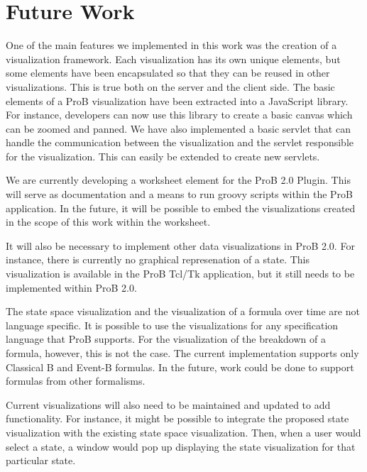 \section{Future Work}

One of the main features we implemented in this work was the creation of a visualization framework. Each visualization has its own unique elements, but some elements have been encapsulated so that they can be reused in other visualizations. This is true both on the server and the client side. The basic elements of a ProB visualization have been extracted into a JavaScript library. For instance, developers can now use this library to create a basic canvas which can be zoomed and panned. We have also implemented a basic servlet that can handle the communication between the visualization and the servlet responsible for the visualization. This can easily be extended to create new servlets.

We are currently developing a worksheet element for the ProB 2.0 Plugin. This will serve as documentation and a means to run groovy scripts within the ProB application. In the future, it will be possible to embed the visualizations created in the scope of this work within the worksheet. 

It will also be necessary to implement other data visualizations in ProB 2.0. For instance, there is currently no graphical represenation of a state. This visualization is available in the ProB Tcl/Tk application, but it still needs to be implemented within ProB 2.0.

The state space visualization and the visualization of a formula over time are not language specific. It is possible to use the visualizations for any specification language that ProB supports. For the visualization of the breakdown of a formula, however, this is not the case. The current implementation supports only Classical B and Event-B formulas. In the future, work could be done to support formulas from other formalisms.

Current visualizations will also need to be maintained and updated to add functionality. For instance, it might be possible to integrate the proposed state visualization with the existing state space visualization. Then, when a user would select a state, a window would pop up displaying the state visualization for that particular state.